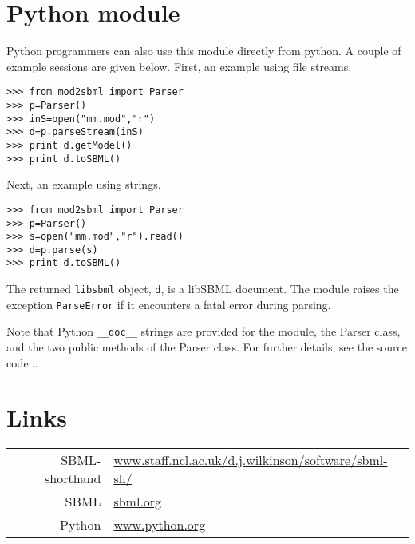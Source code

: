 \documentclass[12pt,a4paper]{article}
\begin{document}
\section{Python module}

Python programmers can also use this module directly from python. A
couple of example sessions are given below.
First, an example using file streams.
\begin{verbatim}
>>> from mod2sbml import Parser
>>> p=Parser()
>>> inS=open("mm.mod","r")
>>> d=p.parseStream(inS)
>>> print d.getModel()
>>> print d.toSBML()
\end{verbatim}
Next, an example using strings.
\begin{verbatim}
>>> from mod2sbml import Parser
>>> p=Parser()
>>> s=open("mm.mod","r").read()
>>> d=p.parse(s)
>>> print d.toSBML()
\end{verbatim}
The returned \verb$libsbml$ object, \verb$d$, is a libSBML
document. The module raises the exception \texttt{ParseError} if it 
encounters a fatal error during parsing.

Note that Python \verb$__doc__$ strings are provided for the module, the Parser class, and the
two public methods of the Parser class. For further details, see the
source code...

\section{Links}

\begin{tabular}{rl}
SBML-shorthand & {\small
\href{http://www.staff.ncl.ac.uk/d.j.wilkinson/software/sbml-sh/}{\url{www.staff.ncl.ac.uk/d.j.wilkinson/software/sbml-sh/}}
}\\
SBML & \href{http://sbml.org/}{\url{sbml.org}} \\
Python & \href{http://www.python.org/}{\url{www.python.org}}
\end{tabular}
\end{document}
